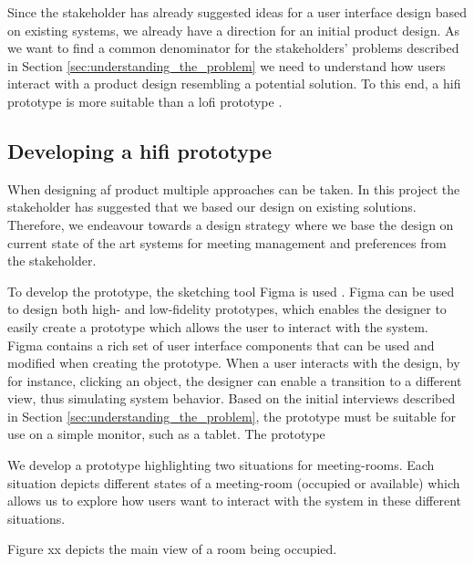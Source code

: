 Since the stakeholder has already suggested ideas for a user interface design based on existing systems, we already have a direction for an initial product design. 
As we want to find a common denominator for the stakeholders' problems described in Section \ref{sec:understanding_the_problem} we need to understand how users interact with a product design resembling a potential solution.
To this end, a hifi prototype is more suitable than a lofi prototype \cite{low-vs-high-fidelity-prototype}.

\subsection{Developing a hifi prototype}
When designing af product multiple approaches can be taken. 
In this project the stakeholder has suggested that we based our design on existing solutions.
Therefore, we endeavour towards a design strategy where we base the design on current state of the art systems for meeting management and preferences from the stakeholder.

To develop the prototype, the sketching tool Figma is used \cite{}.
Figma can be used to design both high- and low-fidelity prototypes, which enables the designer to easily create a prototype which allows the user to interact with the system.
Figma contains a rich set of user interface components that can be used and modified when creating the prototype.
When a user interacts with the design, by for instance, clicking an object, the designer can enable a transition to a different view, thus simulating system behavior.  
Based on the initial interviews described in Section \ref{sec:understanding_the_problem}, the prototype must be suitable for use on a simple monitor, such as a tablet.
The prototype 

We develop a prototype highlighting two situations for meeting-rooms.
Each situation depicts different states of a meeting-room (occupied or available) which allows us to explore how users want to interact with the system in these different situations. 

Figure xx depicts the main view of a room being occupied.
